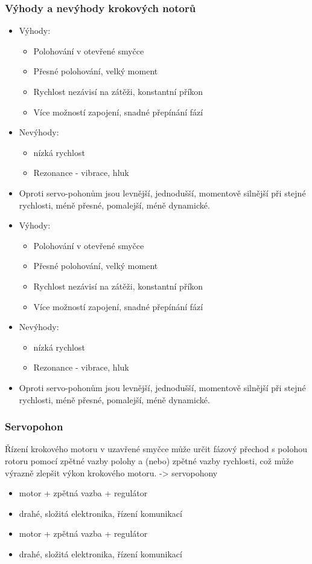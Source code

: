\subsubsection*{Výhody a nevýhody krokových notorů}
\begin{itemize}
  \item Výhody: \begin{itemize}
    \item Polohování v otevřené smyčce
    \item Přesné polohování, velký moment
    \item Rychlost nezávisí na zátěži, konstantní příkon
    \item Více možností zapojení, snadné přepínání fází
  \end{itemize}
  \item Nevýhody: \begin{itemize}
    \item nízká rychlost
    \item Rezonance - vibrace, hluk
  \end{itemize}
  \item Oproti servo-pohonům jsou levnější, jednodušší, momentově silnější při stejné rychlosti, méně přesné, pomalejší, méně dynamické.
    \item Výhody: \begin{itemize}
              \item Polohování v otevřené smyčce
              \item Přesné polohování, velký moment
              \item Rychlost nezávisí na zátěži, konstantní příkon
              \item Více možností zapojení, snadné přepínání fází
          \end{itemize}
    \item Nevýhody: \begin{itemize}
              \item nízká rychlost
              \item Rezonance - vibrace, hluk
          \end{itemize}
    \item Oproti servo-pohonům jsou levnější, jednodušší, momentově silnější při stejné rychlosti, méně přesné, pomalejší, méně dynamické.
\end{itemize}

\subsubsection*{Servopohon}
Řízení krokového motoru v uzavřené smyčce může určit fázový přechod s polohou rotoru pomocí zpětné vazby polohy a (nebo) zpětné vazby rychlosti, což může výrazně zlepšit výkon krokového motoru. -> servopohony
\begin{itemize}
  \item motor + zpětná vazba + regulátor
  \item drahé, složitá elektronika, řízení komunikací
    \item motor + zpětná vazba + regulátor
    \item drahé, složitá elektronika, řízení komunikací
\end{itemize}

